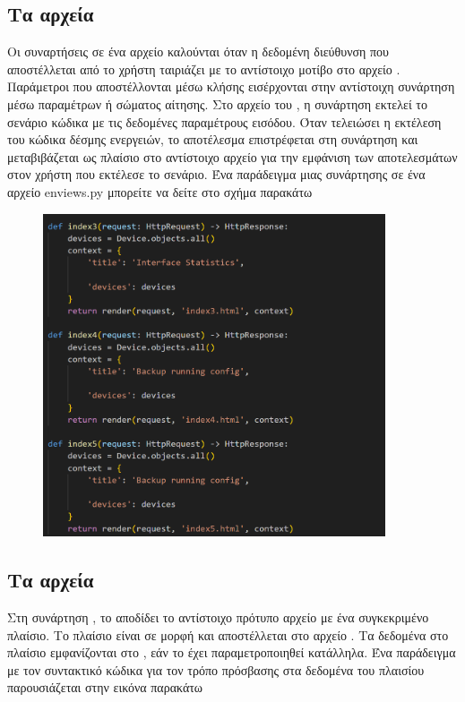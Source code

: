 \subsection{Τα αρχεία }

Οι συναρτήσεις σε ένα αρχείο  καλούνται όταν η δεδομένη διεύθυνση  που αποστέλλεται από το
χρήστη ταιριάζει με το αντίστοιχο μοτίβο  στο αρχείο . Παράμετροι που αποστέλλονται μέσω κλήσης
 εισέρχονται στην αντίστοιχη συνάρτηση μέσω παραμέτρων ή σώματος αίτησης. Στο αρχείο  του , η συνάρτηση εκτελεί το σενάριο
κώδικα με τις δεδομένες παραμέτρους εισόδου. Όταν τελειώσει η εκτέλεση του κώδικα δέσμης ενεργειών,
το αποτέλεσμα επιστρέφεται στη συνάρτηση  και μεταβιβάζεται ως πλαίσιο στο αντίστοιχο αρχείο  για την εμφάνιση των αποτελεσμάτων στον χρήστη που εκτέλεσε το σενάριο.
Ένα παράδειγμα μιας συνάρτησης σε ένα αρχείο en{views.py} μπορείτε να δείτε στο σχήμα παρακάτω

\begin{figure}[htb]
	\centering
	\includegraphics[width=0.9\textwidth]{graphics/viewspy.png}
	\caption{ }
\end{figure}

\subsection{Τα αρχεία }

Στη συνάρτηση , το  αποδίδει το αντίστοιχο πρότυπο 
αρχείο με ένα συγκεκριμένο πλαίσιο. Το πλαίσιο είναι σε μορφή  και αποστέλλεται στο αρχείο . Τα δεδομένα στο πλαίσιο εμφανίζονται
στο , εάν το  έχει παραμετροποιηθεί κατάλληλα. Ένα παράδειγμα  με
τον συντακτικό κώδικα για τον τρόπο πρόσβασης στα δεδομένα του πλαισίου παρουσιάζεται στην εικόνα παρακάτω



